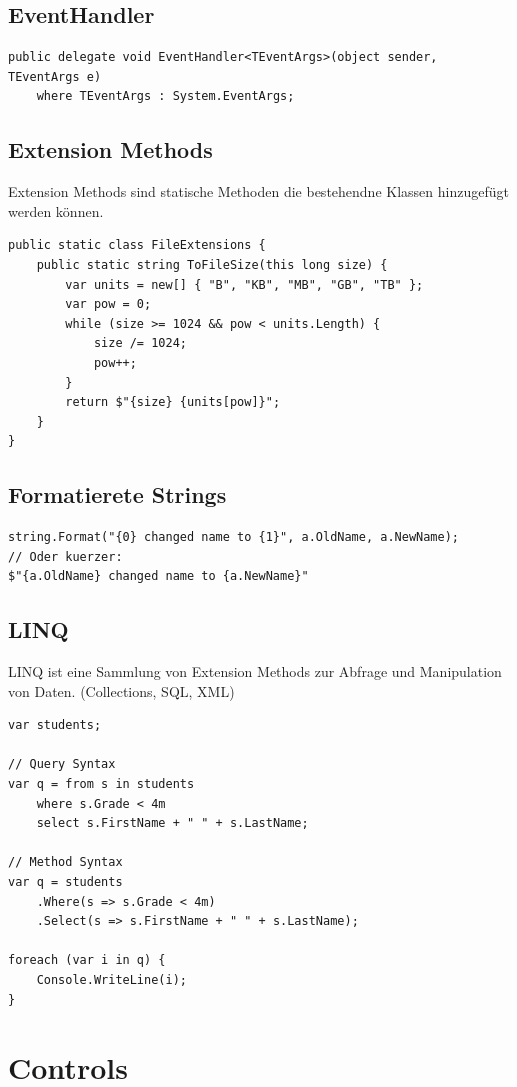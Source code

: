 \subsection{EventHandler}
\begin{lstlisting}[caption=C\# Event Handler]
public delegate void EventHandler<TEventArgs>(object sender, TEventArgs e)
	where TEventArgs : System.EventArgs;
\end{lstlisting}

\subsection{Extension Methods}
Extension Methods sind statische Methoden die bestehendne Klassen hinzugefügt werden können. 
\begin{lstlisting}[caption=C\# Extension Methods]
public static class FileExtensions {
	public static string ToFileSize(this long size) {
		var units = new[] { "B", "KB", "MB", "GB", "TB" };
		var pow = 0;
		while (size >= 1024 && pow < units.Length) {
			size /= 1024;
			pow++;
		}
		return $"{size} {units[pow]}";
	}
}
\end{lstlisting}

\subsection{Formatierete Strings}
\begin{lstlisting}[caption=C\# Events]
string.Format("{0} changed name to {1}", a.OldName, a.NewName);
// Oder kuerzer:
$"{a.OldName} changed name to {a.NewName}"
\end{lstlisting}

\subsection{LINQ}
LINQ ist eine Sammlung von Extension Methods zur Abfrage und Manipulation von Daten. (Collections, SQL, XML)
\begin{lstlisting}[caption=LINQ]
var students;

// Query Syntax
var q = from s in students
	where s.Grade < 4m
	select s.FirstName + " " + s.LastName;

// Method Syntax
var q = students
	.Where(s => s.Grade < 4m)
	.Select(s => s.FirstName + " " + s.LastName);
	
foreach (var i in q) {
	Console.WriteLine(i);
}
\end{lstlisting}

\section{Controls}
